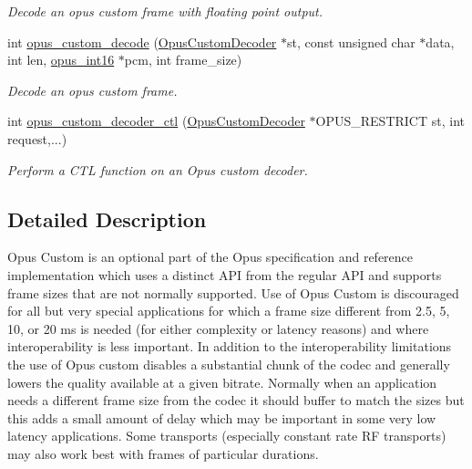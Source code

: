 \begin{DoxyCompactItemize}
\begin{DoxyCompactList}\small\item\em Decode an opus custom frame with floating point output. \item\end{DoxyCompactList}\item 
int \hyperlink{group__opus__custom_gafb6d3b90eed41b938009f4a32d633363}{opus\_\-custom\_\-decode} (\hyperlink{group__opus__custom_gacae60f89c5ce7aeea69503451b9e2e6f}{OpusCustomDecoder} $\ast$st, const unsigned char $\ast$data, int len, \hyperlink{opus__types_8h_acc9ed7cf60479eb81f9648c6ec27dc26}{opus\_\-int16} $\ast$pcm, int frame\_\-size)
\begin{DoxyCompactList}\small\item\em Decode an opus custom frame. \item\end{DoxyCompactList}\item 
int \hyperlink{group__opus__custom_ga88b9248e497f3c1b894f035011c569a9}{opus\_\-custom\_\-decoder\_\-ctl} (\hyperlink{group__opus__custom_gacae60f89c5ce7aeea69503451b9e2e6f}{OpusCustomDecoder} $\ast$OPUS\_\-RESTRICT st, int request,...)
\begin{DoxyCompactList}\small\item\em Perform a CTL function on an Opus custom decoder. \item\end{DoxyCompactList}\end{DoxyCompactItemize}


\subsection{Detailed Description}
Opus Custom is an optional part of the Opus specification and reference implementation which uses a distinct API from the regular API and supports frame sizes that are not normally supported. Use of Opus Custom is discouraged for all but very special applications for which a frame size different from 2.5, 5, 10, or 20 ms is needed (for either complexity or latency reasons) and where interoperability is less important. In addition to the interoperability limitations the use of Opus custom disables a substantial chunk of the codec and generally lowers the quality available at a given bitrate. Normally when an application needs a different frame size from the codec it should buffer to match the sizes but this adds a small amount of delay which may be important in some very low latency applications. Some transports (especially constant rate RF transports) may also work best with frames of particular durations.

